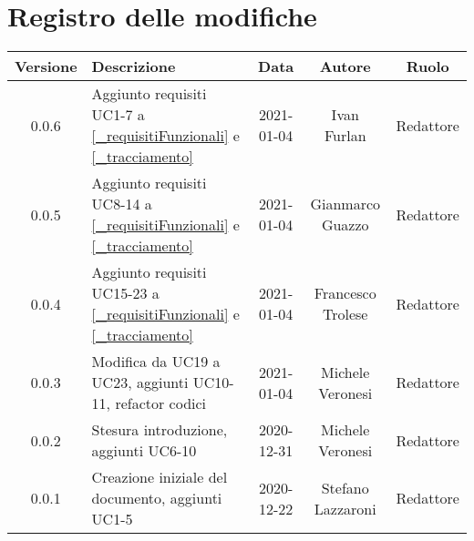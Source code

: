\section*{Registro delle modifiche}

\begin{center}
	\begin{longtable}{|c|p{5cm}|c|c|c|}
	\hline
	\rowcolor{lighter-grayer}
	\textbf{Versione} & \textbf{Descrizione} & \textbf{Data} & \textbf{Autore} & \textbf{Ruolo} \\
	\hline
	\endfirsthead


	\hline
	0.0.6 & Aggiunto requisiti UC1-7 a \ref{_requisitiFunzionali} e \ref{_tracciamento} & 2021-01-04 & Ivan Furlan & Redattore \\
	0.0.5 & Aggiunto requisiti UC8-14 a \ref{_requisitiFunzionali} e \ref{_tracciamento} & 2021-01-04 & Gianmarco Guazzo & Redattore \\
	0.0.4 & Aggiunto requisiti UC15-23 a \ref{_requisitiFunzionali} e \ref{_tracciamento} & 2021-01-04 & Francesco Trolese & Redattore \\
	0.0.3 & Modifica da UC19 a UC23, aggiunti UC10-11, refactor codici & 2021-01-04 & Michele Veronesi & Redattore \\
	0.0.2 & Stesura introduzione, aggiunti UC6-10 & 2020-12-31 & Michele Veronesi & Redattore\\
    0.0.1 & Creazione iniziale del documento, aggiunti UC1-5 & 2020-12-22 & Stefano Lazzaroni & Redattore\\
	\hline

	\end{longtable}
\end{center}